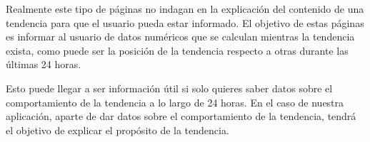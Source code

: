 \vspace{0.3cm}

Realmente este tipo de páginas no indagan en la explicación del contenido de una tendencia para que el usuario pueda estar informado. El objetivo de estas páginas es informar al usuario de datos numéricos que se calculan mientras la tendencia exista, como puede ser la posición de la tendencia respecto a otras durante las últimas 24 horas.

\vspace{0.3cm}

Esto puede llegar a ser información útil si solo quieres saber datos sobre el comportamiento de la tendencia a lo largo de 24 horas. En el caso de nuestra aplicación, aparte de dar datos sobre el comportamiento de la tendencia, tendrá el objetivo de explicar el propósito de la tendencia.